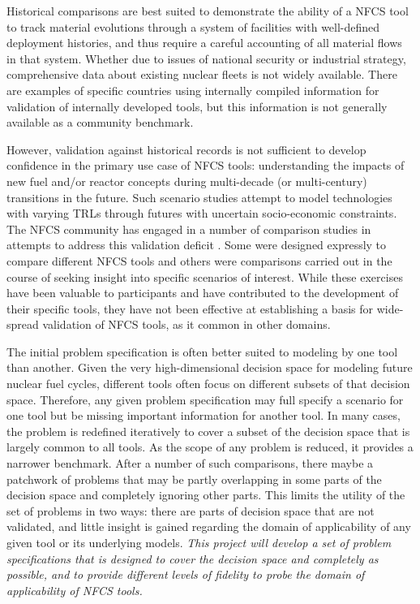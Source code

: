Historical comparisons are best suited to demonstrate the ability of a
\gls{NFCS} tool to track material evolutions through a system of facilities
with well-defined deployment histories, and thus require a careful accounting
of all material flows in that system.  Whether due to issues of national
security or industrial strategy, comprehensive data about existing nuclear
fleets is not widely available.  There are examples of specific countries
using internally compiled information for validation of internally developed
tools\cite{COSI6}, but this information is not generally available
as a community benchmark.

However, validation against historical records is not sufficient to develop
confidence in the primary use case of \gls{NFCS} tools: understanding the
impacts of new fuel and/or reactor concepts during multi-decade (or
multi-century) transitions in the future.  Such scenario studies attempt to
model technologies with varying \glspl{TRL} through futures with uncertain
socio-economic constraints.  The \gls{NFCS} community has engaged in a number of
comparison studies in attempts to address this validation deficit
\cite{NEAbenchmark, MITbenchmark, FENG.ANE.2016}. Some were designed expressly
to compare different \gls{NFCS} tools and others were comparisons carried out in
the course of seeking insight into specific scenarios of interest. While these
exercises have been valuable to participants and have contributed to the
development of their specific tools, they have not been effective at
establishing a basis for wide-spread validation of \gls{NFCS} tools, as it
common in other domains.

The initial problem specification is often better suited to modeling by one
tool than another.  Given the very high-dimensional decision space for
modeling future nuclear fuel cycles, different tools often focus on different
subsets of that decision space.  Therefore, any given problem specification
may full specify a scenario for one tool but be missing important information
for another tool.  In many cases, the problem is redefined iteratively to
cover a subset of the decision space that is largely common to all tools.  As
the scope of any problem is reduced, it provides a narrower benchmark.  After
a number of such comparisons, there maybe a patchwork of problems that may be
partly overlapping in some parts of the decision space and completely ignoring
other parts.  This limits the utility of the set of problems in two ways:
there are parts of decision space that are not validated, and little insight
is gained regarding the domain of applicability of any given tool or its
underlying models. \emph{This project will develop a set of problem
  specifications that is designed to cover the decision space and completely
  as possible, and to provide different levels of fidelity to probe the domain
  of applicability of \gls{NFCS} tools.}

